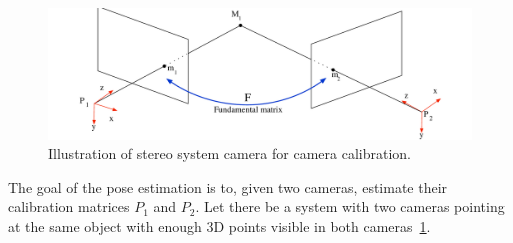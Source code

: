 \begin{figure}[ht]
	\begin{center}
		\includegraphics[keepaspectratio,width=\textwidth]{fig/stereo2.pdf}
	\end{center}
	\caption{Illustration of stereo system camera for camera calibration.}
	\label{fig:stereo2}
\end{figure}

The goal of the pose estimation is to, given two cameras, estimate their calibration matrices $P_1$ and $P_2$. Let there be a system with two cameras pointing at the same object with enough 3D points visible in both cameras~\ref{fig:stereo2}. 
